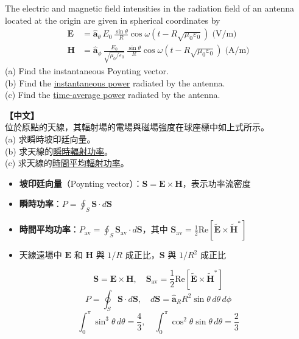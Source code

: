 \documentclass[12pt,a4paper]{article}
\newcommand{\vE}{\mathbf{E}}
\newcommand{\vH}{\mathbf{H}}
\newcommand{\vS}{\mathbf{S}}
\newcommand{\aR}{\hat{\mathbf{a}}_R}
\newcommand{\ath}{\hat{\mathbf{a}}_\theta}
\newcommand{\aph}{\hat{\mathbf{a}}_\phi}
\begin{document}
\begin{questionbox}
The electric and magnetic field intensities in the radiation field of an antenna located at the origin are given in spherical coordinates by
\begin{align*}
  \vE &= \ath\,E_0\,\frac{\sin\theta}{R}\cos\omega\!\left(t - R\sqrt{\mu_0\varepsilon_0}\right) \;\text{(V/m)} \\
  \vH &= \aph\,\frac{E_0}{\sqrt{\mu_0/\varepsilon_0}}\,\frac{\sin\theta}{R}\cos\omega\!\left(t - R\sqrt{\mu_0\varepsilon_0}\right) \;\text{(A/m)}
\end{align*}
(a) Find the instantaneous Poynting vector.\\
(b) Find the \underline{instantaneous power} radiated by the antenna.\\
(c) Find the \underline{time-average power} radiated by the antenna.

\medskip\noindent\textbf{【中文】}\\
位於原點的天線，其輻射場的電場與磁場強度在球座標中如上式所示。\\
(a) 求瞬時坡印廷向量。\\
(b) 求天線的\underline{瞬時輻射功率}。\\
(c) 求天線的\underline{時間平均輻射功率}。
\end{questionbox}

\begin{conceptbox}[核心概念]
\begin{itemize}
  \item \textbf{坡印廷向量}（Poynting vector）：$\vS = \vE \times \vH$，表示功率流密度
  \item \textbf{瞬時功率}：$P = \oint_S \vS \cdot d\vS$
  \item \textbf{時間平均功率}：$P_{\text{av}} = \oint_S \vS_{\text{av}} \cdot d\vS$，其中 $\vS_{\text{av}} = \frac{1}{2}\text{Re}[\tilde{\vE}\times\tilde{\vH}^*]$
  \item 天線遠場中 $\vE$ 和 $\vH$ 與 $1/R$ 成正比，$\vS$ 與 $1/R^2$ 成正比
\end{itemize}
\end{conceptbox}

\begin{formulabox}[相關公式]
\[
  \vS = \vE \times \vH, \quad \vS_{\text{av}} = \frac{1}{2}\text{Re}[\tilde{\vE}\times\tilde{\vH}^*]
\]
\[
  P = \oint_S \vS \cdot d\vS, \quad d\vS = \aR R^2 \sin\theta\,d\theta\,d\phi
\]
\[
  \int_0^\pi \sin^3\theta\,d\theta = \frac{4}{3}, \quad
  \int_0^\pi \cos^2\theta\sin\theta\,d\theta = \frac{2}{3}
\]
\end{formulabox}
\end{document}
